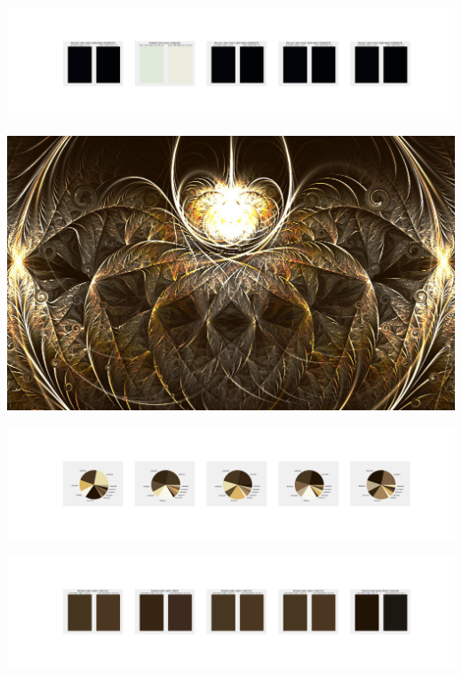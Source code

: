 \documentclass[11pt]{article}
\begin{document}
\begin{landscape}
    \begin{center}
    \includegraphics[width=250mm]{./nbimg/peak-419.jpg}
    \end{center}
    

    \begin{center}
    \includegraphics[width=\textwidth]{./nbimg/file (71).jpg}
    \end{center}

    \begin{center}
    \includegraphics[width=250mm]{./nbimg/pie-420.jpg}
    \end{center}

    \begin{center}
    \includegraphics[width=250mm]{./nbimg/peak-420.jpg}
    \end{center}
    


\end{landscape}
\end{document}
